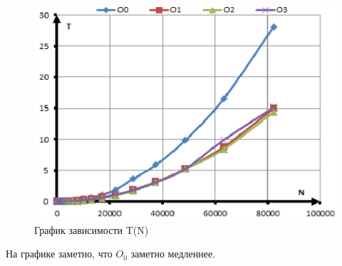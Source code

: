 \documentclass[a4paper, 12pt]{article}
\begin{document}
\begin{enumerate}
    \begin{figure}[h!]
            \centering
    		      \includegraphics[scale = 0.55]{3.png}
    		      \caption{График зависимости T(N)}
    		      \label{fig:my_label}
    	\end{figure}
    На графике заметно, что $O_0$ заметно медленнее.


\end{enumerate}
\end{document}
